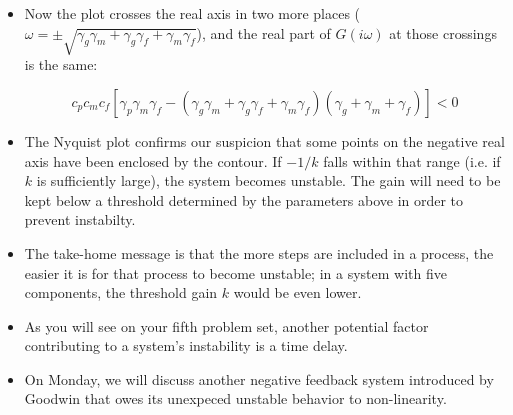 \documentclass{article}
\begin{document}
\begin{itemize}
\item Now the plot crosses the real axis in two more places ($\omega = \pm \sqrt{ \gamma_g \gamma_m + \gamma_g \gamma_f + \gamma_m \gamma_f}$), and the real part of $G(i\omega)$ at those crossings is the same:

\[ c_p c_m c_f \left[ \gamma_p \gamma_m \gamma_f - \left( \gamma_g \gamma_m + \gamma_g \gamma_f + \gamma_m \gamma_f \right) \left(\gamma_g + \gamma_m + \gamma_f \right) \right] < 0  \]

\item The Nyquist plot confirms our suspicion that some points on the negative real axis have been enclosed by the contour. If $-1/k$ falls within that range (i.e. if $k$ is sufficiently large),  the system becomes unstable. The gain will need to be kept below a threshold determined by the parameters above in order to prevent instabilty.

\item The take-home message is that the more steps are included in a process, the easier it is for that process to become unstable; in a system with five components, the threshold gain $k$ would be even lower.
\item As you will see on your fifth problem set, another potential factor contributing to a system's instability is a time delay.
\item On Monday, we will discuss another negative feedback system introduced by Goodwin that owes its unexpeced unstable behavior to non-linearity.

\end{itemize}
\end{document}
